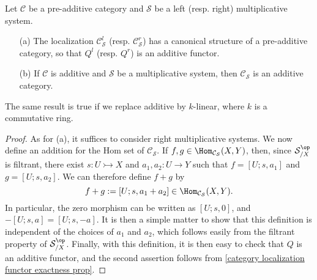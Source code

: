 \begin{theorem}\label{category localization additive prop}
Let $\mathcal{C}$ be a pre-additive category and $\mathcal{S}$ be a left (resp. right) multiplicative system.
\begin{enumerate}
    \item[(a)] The localization $\mathcal{C}_\mathcal{S}^l$ (resp. $\mathcal{C}_\mathcal{S}^r$) has a canonical structure of a pre-additive category, so that $Q^l$ (resp. $Q^r$) is an additive functor.
    \item[(b)] If $\mathcal{C}$ is additive and $\mathcal{S}$ be a multiplicative system, then $\mathcal{C}_\mathcal{S}$ is an additive category.  
\end{enumerate}
The same result is true if we replace additive by $k$-linear, where $k$ is a commutative ring.
\end{theorem}
\begin{proof}
As for (a), it suffices to consider right multiplicative systems. We now define an addition for the Hom set of $\mathcal{C}_\mathcal{S}$. If $f,g\in\Hom_{\mathcal{C}_\mathcal{S}}(X,Y)$, then, since $\mathcal{S}_{/X}^{\op}$ is filtrant, there exist $s:U\rightarrowtail X$ and $a_1,a_2:U\to Y$ such that $f=[U;s,a_1]$ and $g=[U;s,a_2]$. We can therefore define $f+g$ by
\[f+g:=[U;s,a_1+a_2]\in\Hom_{\mathcal{C}_\mathcal{S}}(X,Y).\]
In particular, the zero morphism can be written as $[U;s,0]$, and $-[U;s,a]=[U;s,-a]$. It is then a simple matter to show that this definition is independent of the choices of $a_1$ and $a_2$, which follows easily from the filtrant property of $\mathcal{S}_{/X}^{\op}$. Finally, with this definition, it is then easy to check that $Q$ is an additive functor, and the second assertion follows from \cref{category localization functor exactness prop}.
\end{proof}

